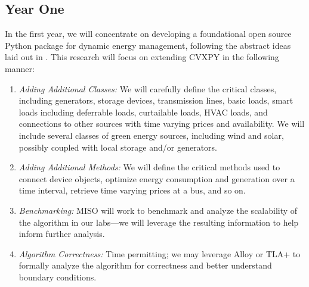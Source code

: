 \documentclass[12pt]{article}
\begin{document}
\subsection{Year One}
In the first year,
we will concentrate on developing a foundational open source Python package
for dynamic energy management,
following the abstract ideas laid out in \cite{kraning2014dynamic}.
This research will focus on extending CVXPY in the following manner:
\begin{enumerate}
\item \emph{Adding Additional Classes:}
We will carefully define the critical classes,
including generators, storage devices, transmission lines,
basic loads, smart loads including deferrable loads, curtailable loads, HVAC loads,
and connections to other sources with time varying prices and availability.
We will include several classes of green energy sources, including wind and solar,
possibly coupled with local storage and/or generators.

\item \emph{Adding Additional Methods:}
We will define the critical methods used to connect device objects,
optimize energy consumption and generation over a time interval,
retrieve time varying prices at a bus, and so on.

\item \emph{Benchmarking:}
MISO will work to benchmark and analyze the scalability of the algorithm
in our labs---we will leverage the resulting information to help inform further analysis.

\item \emph{Algorithm Correctness:}
Time permitting;
we may leverage Alloy or TLA+ to formally analyze the algorithm for correctness
and better understand boundary conditions.
\end{enumerate}
\end{document}
